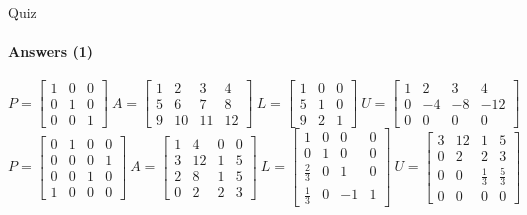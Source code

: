 \documentclass[aspectratio=169]{beamer}
\begin{document}
\begin{frame}[t]{Quiz}
\framesubtitle{Answers (1)}
\setcounter{equation}{0}
\begin{equation}
    P=\begin{bmatrix}
    1 & 0 & 0 \\
    0 & 1 & 0 \\ 
    0 & 0  & 1 
    \end{bmatrix}\ A=\begin{bmatrix}
        1 & 2  & 3  & 4  \\
        5 & 6  & 7  & 8  \\
        9 & 10 & 11 & 12
    \end{bmatrix}\ L=\begin{bmatrix}
    1 & 0 & 0 \\
    5 & 1 & 0 \\ 
    9 & 2  & 1 
    \end{bmatrix}\ U=\begin{bmatrix}
    1 & 2 & 3 & 4\\
    0 & -4 & -8 & -12\\ 
    0 & 0  & 0 & 0 
    \end{bmatrix}
\end{equation}
\begin{equation}
    P=\begin{bmatrix}
    0 & 1 & 0 & 0 \\
    0 & 0 & 0 & 1\\ 
    0 & 0  & 1 & 0 \\
    1 & 0 & 0 & 0 
    \end{bmatrix}\ A=\begin{bmatrix}
        1 & 4  & 0 & 0 \\
        3 & 12 & 1 & 5 \\
        2 & 8  & 1 & 5 \\
        0 & 2  & 2 & 3
    \end{bmatrix}\ L=\begin{bmatrix}
    1 & 0 & 0 & 0 \\
    0 & 1 & 0 & 0\\ 
    \frac{2}{3} & 0  & 1 & 0 \\ 
    \frac{1}{3} & 0 & -1 & 1 
    \end{bmatrix}\ U=\begin{bmatrix}
    3 & 12 & 1 & 5\\
    0 & 2 & 2 & 3\\ 
    0 & 0  & \frac{1}{3} & \frac{5}{3}\\
    0 & 0 & 0 & 0 
    \end{bmatrix}
\end{equation}
\end{frame}
\end{document}
